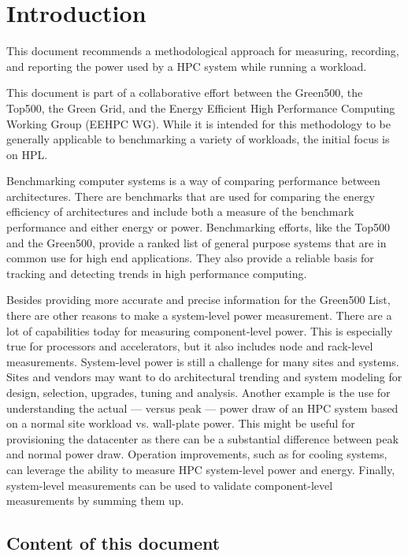 \chapter{Introduction}
\label{sec:intro}

This document recommends a methodological approach for measuring, recording, and reporting the power used by a \ac{HPC} system while running a workload.

This document is part of a collaborative effort between the Green500, the Top500, the Green Grid, and the Energy Efficient High Performance Computing Working Group (EEHPC WG).
While it is intended for this methodology to be generally applicable to benchmarking a variety of workloads, the initial focus is on \ac{HPL}.

Benchmarking computer systems is a way of comparing performance between architectures.
There are benchmarks that are used for comparing the energy efficiency of architectures and include both a measure of the benchmark performance and either energy or power.
Benchmarking efforts, like the Top500 and the Green500, provide a ranked list of general purpose systems that are in common use for high end applications.
They also provide a reliable basis for tracking and detecting trends in high performance computing.

Besides providing more accurate and precise information for the Green500 List, there are other reasons to make a system-level power measurement.
There are a lot of capabilities today for measuring component-level power.
This is especially true for processors and accelerators, but it also includes node and rack-level measurements.
System-level power is still a challenge for many sites and systems.
Sites and vendors may want to do architectural trending and system modeling for design, selection, upgrades, tuning and analysis.
Another example is the use for understanding the actual --- versus peak --- power draw of an HPC system based on a normal site workload vs. wall-plate power.
This might be useful for provisioning the datacenter as there can be a substantial difference between peak and normal power draw. Operation improvements, such as for cooling systems, can leverage the ability to measure HPC system-level power and energy.
Finally, system-level measurements can be used to validate component-level measurements by summing them up.


\section{Content of this document}


